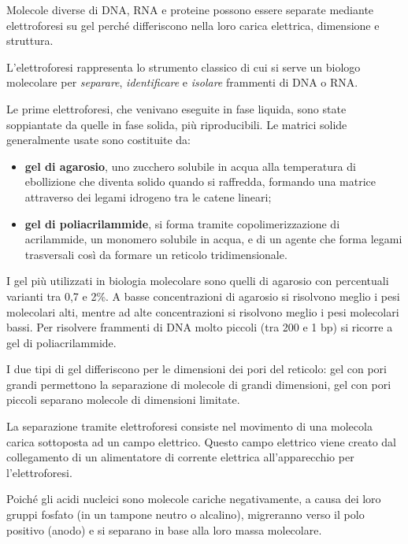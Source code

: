 \documentclass[11pt]{book}
\begin{document}
Molecole diverse di DNA, RNA e proteine possono essere separate mediante
elettroforesi su gel perché differiscono nella loro carica elettrica,
dimensione e struttura.

L'elettroforesi rappresenta lo strumento classico di cui si serve un
biologo molecolare per \emph{separare}, \emph{identificare} e
\emph{isolare} frammenti di DNA o RNA.

Le prime elettroforesi, che venivano eseguite in fase liquida, sono
state soppiantate da quelle in fase solida, più riproducibili. Le
matrici solide generalmente usate sono costituite da:

\begin{itemize}
\itemsep1pt\parskip0pt
\item
  \textbf{gel di agarosio}, uno zucchero solubile in acqua alla
  temperatura di ebollizione che diventa solido quando si raffredda,
  formando una matrice attraverso dei legami idrogeno tra le catene
  lineari;
\item
  \textbf{gel di poliacrilammide}, si forma tramite copolimerizzazione
  di acrilammide, un monomero solubile in acqua, e di un agente che
  forma legami trasversali così da formare un reticolo tridimensionale.
\end{itemize}

I gel più utilizzati in biologia molecolare sono quelli di agarosio con
percentuali varianti tra 0,7 e 2\%. A basse concentrazioni di agarosio
si risolvono meglio i pesi molecolari alti, mentre ad alte
concentrazioni si risolvono meglio i pesi molecolari bassi. Per
risolvere frammenti di DNA molto piccoli (tra 200 e 1 bp) si ricorre a
gel di poliacrilammide.

I due tipi di gel differiscono per le dimensioni dei pori del reticolo:
gel con pori grandi permettono la separazione di molecole di grandi
dimensioni, gel con pori piccoli separano molecole di dimensioni
limitate.

La separazione tramite elettroforesi consiste nel movimento di una
molecola carica sottoposta ad un campo elettrico. Questo campo elettrico
viene creato dal collegamento di un alimentatore di corrente elettrica
all'apparecchio per l'elettroforesi.

Poiché gli acidi nucleici sono molecole cariche negativamente, a causa
dei loro gruppi fosfato (in un tampone neutro o alcalino), migreranno
verso il polo positivo (anodo) e si separano in base alla loro massa
molecolare.
\end{document}
